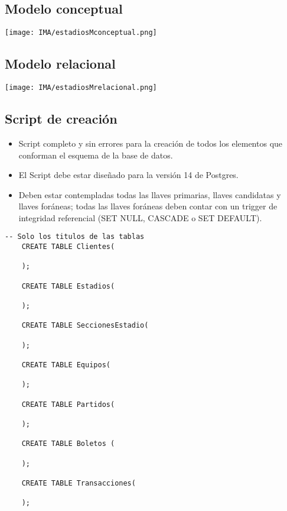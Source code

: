 \subsection{Modelo conceptual}
\begin{center}
    \texttt{[image: IMA/estadiosMconceptual.png]}
\end{center}


\subsection{Modelo relacional}
\begin{center}
    \texttt{[image: IMA/estadiosMrelacional.png]}
\end{center}


\subsection{Script de creación}

\begin{itemize}
    \item Script completo y sin errores para la creación de todos los elementos que conforman el esquema
            de la base de datos.
    \item El Script debe estar diseñado para la versión 14 de Postgres.
    \item Deben estar contempladas todas las llaves primarias, llaves candidatas y llaves foráneas;
    todas las llaves foráneas deben contar con un trigger de integridad referencial (SET NULL,
    CASCADE o SET DEFAULT).
\end{itemize}


\begin{lstlisting}[caption={Tablas para la BdDatos}, label={lst:sql_estadios}]
    -- Solo los titulos de las tablas    
    CREATE TABLE Clientes(

    );

    CREATE TABLE Estadios(

    );

    CREATE TABLE SeccionesEstadio(

    );

    CREATE TABLE Equipos(

    );

    CREATE TABLE Partidos(

    );

    CREATE TABLE Boletos (

    );

    CREATE TABLE Transacciones(

    );
\end{lstlisting}

